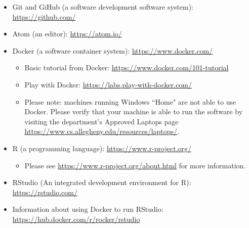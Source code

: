 \documentclass[11pt]{article} %
\begin{document}
\begin{itemize}
\item Git and GiHub (a software development software system): \url{https://github.com/}
\item Atom (an editor): \url{https://atom.io/}
\item Docker (a software container system): \url{https://www.docker.com/}
	\begin{itemize}
		\item Basic tutorial from Docker: \url{https://www.docker.com/101-tutorial}
		\item Play with Docker: \url{https://labs.play-with-docker.com/}
		\item Please note: machines running Windows ``Home" are not able to use Docker. Please verify that your machine is able to run the software by visiting the department's Approved Laptops page \url{https://www.cs.allegheny.edu/resources/laptops/}.
	\end{itemize}
	\item R (a programming language): \url{https://www.r-project.org/}
	\begin{itemize}
		\item Please see \url{https://www.r-project.org/about.html} for more information.
	\end{itemize}
	\item RStudio (An integrated development environment for R): \url{https://rstudio.com/}
	\item Information about using Docker to run RStudio: \url{https://hub.docker.com/r/rocker/rstudio}
\end{itemize}


\end{document}
